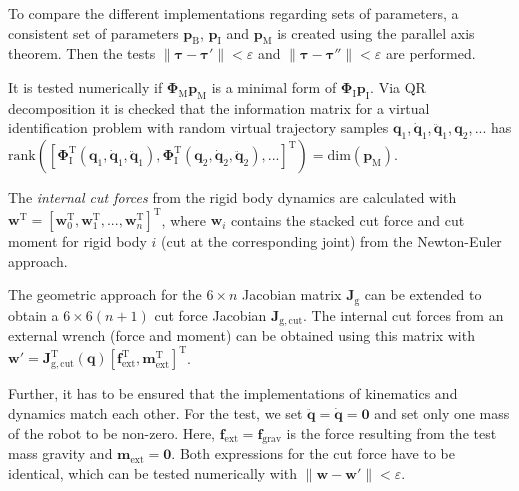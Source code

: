 \documentclass[runningheads]{llncs}
\newcommand{\transp}[0]{{\mathrm{T}}}
\begin{document}
\begin{test}\label{test:ser_dynpar}
To compare the different implementations regarding sets of parameters, a consistent set of parameters $\bm{p}_\mathrm{B}$, $\bm{p}_\mathrm{I}$ and $\bm{p}_\mathrm{M}$ is created using the parallel axis theorem. Then the tests $\lVert \bm{\tau}{-}\bm{\tau}'\rVert {<} \varepsilon$ and $\lVert\bm{\tau}{-}\bm{\tau}''\rVert {<} \varepsilon$ are performed.
\end{test}

\begin{test}\label{test:ser_dynminpar}
It is tested numerically if $\bm{\Phi}_\mathrm{M}\bm{p}_\mathrm{M}$ is a minimal form of $\bm{\Phi}_\mathrm{I}\bm{p}_\mathrm{I}$.
Via QR decomposition it is checked that the information matrix for a virtual identification problem with random virtual trajectory samples $\bm{q}_1$,\,$\dot{\bm{q}}_1$,\,$\ddot{\bm{q}}_1$,\,$\bm{q}_2$,\,... has $\mathrm{rank}([\bm{\Phi}_\mathrm{I}^\transp(\bm{q}_1,\dot{\bm{q}}_1,\ddot{\bm{q}}_1),\bm{\Phi}_\mathrm{I}^\transp(\bm{q}_2,\dot{\bm{q}}_2,\ddot{\bm{q}}_2),...]^\transp){=}\mathrm{dim}(\bm{p}_\mathrm{M})$.
\end{test}



\begin{property}\label{prop:ser_cutforceint}
The \emph{internal cut forces} from the rigid body dynamics are calculated with $\bm{w}^\transp{=}[\bm{w}_0^\transp,\bm{w}_1^\transp,...,\bm{w}_n^\transp]^\transp$, where $\bm{w}_i$ contains the stacked cut force and cut moment for rigid body $i$ (cut at the corresponding joint) from the Newton-Euler approach.
\end{property}

\begin{property}\label{prop:ser_cutforceext}
The geometric approach for the $6 {\times} n$ Jacobian matrix $\bm{J}_{\mathrm{g}}$ can be extended to obtain a $6 {\times} 6(n{+}1)$ cut force Jacobian $\bm{J}_{\mathrm{g},\mathrm{cut}}$.
The internal cut forces from an external wrench (force and moment) can be obtained using this matrix with $\bm{w}'{=}\bm{J}^\transp_{\mathrm{g},\mathrm{cut}}(\bm{q})[\bm{f}_\mathrm{ext}^\transp,\bm{m}_\mathrm{ext}^\transp]^\transp$.
\end{property}

\begin{test}\label{test:ser_dynjacobi}
Further, it has to be ensured that the implementations of kinematics and dynamics match each other.
For the test, we set $\ddot{\bm{q}}{=}\dot{\bm{q}}{=}\bm{0}$ and set only one mass of the robot to be non-zero.
Here, $\bm{f}_\mathrm{ext}{=}\bm{f}_\mathrm{grav}$ is the force resulting from the test mass gravity and $\bm{m}_\mathrm{ext}{=}\bm{0}$. Both expressions for the cut force have to be identical, which can be tested numerically with 
$\lVert\bm{w}{-}\bm{w}'\rVert {<} \varepsilon$.
\end{test}
\end{document}
